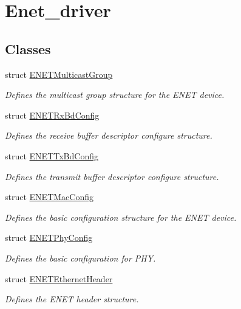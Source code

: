 \hypertarget{group__enet__driver}{}\section{Enet\+\_\+driver}
\label{group__enet__driver}
\subsection*{Classes}
\begin{DoxyCompactItemize}
\item 
struct \hyperlink{structENETMulticastGroup}{E\+N\+E\+T\+Multicast\+Group}
\begin{DoxyCompactList}\small\item\em Defines the multicast group structure for the E\+N\+ET device. \end{DoxyCompactList}\item 
struct \hyperlink{structENETRxBdConfig}{E\+N\+E\+T\+Rx\+Bd\+Config}
\begin{DoxyCompactList}\small\item\em Defines the receive buffer descriptor configure structure. \end{DoxyCompactList}\item 
struct \hyperlink{structENETTxBdConfig}{E\+N\+E\+T\+Tx\+Bd\+Config}
\begin{DoxyCompactList}\small\item\em Defines the transmit buffer descriptor configure structure. \end{DoxyCompactList}\item 
struct \hyperlink{structENETMacConfig}{E\+N\+E\+T\+Mac\+Config}
\begin{DoxyCompactList}\small\item\em Defines the basic configuration structure for the E\+N\+ET device. \end{DoxyCompactList}\item 
struct \hyperlink{structENETPhyConfig}{E\+N\+E\+T\+Phy\+Config}
\begin{DoxyCompactList}\small\item\em Defines the basic configuration for P\+HY. \end{DoxyCompactList}\item 
struct \hyperlink{structENETEthernetHeader}{E\+N\+E\+T\+Ethernet\+Header}
\begin{DoxyCompactList}\small\item\em Defines the E\+N\+ET header structure. \end{DoxyCompactList}\item 

\end{DoxyCompactItemize}
